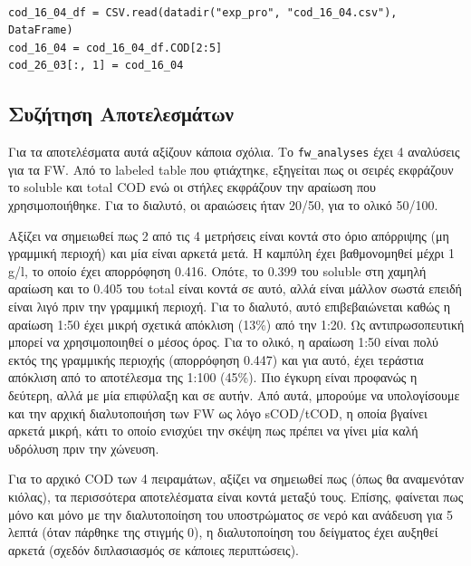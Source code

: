 \documentclass[11pt]{article}
\begin{document}
\begin{verbatim}

cod_16_04_df = CSV.read(datadir("exp_pro", "cod_16_04.csv"), DataFrame)
cod_16_04 = cod_16_04_df.COD[2:5]
cod_26_03[:, 1] = cod_16_04
\end{verbatim}

\subsection{Συζήτηση Αποτελεσμάτων}
\label{sec:org09090ba}
Για τα αποτελέσματα αυτά αξίζουν κάποια σχόλια. Το \texttt{fw\_analyses} έχει 4 αναλύσεις για τα FW. Από το labeled table που φτιάχτηκε, εξηγείται πως οι σειρές εκφράζουν το soluble και total COD ενώ οι στήλες εκφράζουν την αραίωση που χρησιμοποιήθηκε. Για το διαλυτό, οι αραιώσεις ήταν 20/50, για το ολικό 50/100.

Αξίζει να σημειωθεί πως 2 από τις 4 μετρήσεις είναι κοντά στο όριο απόρριψης (μη γραμμική περιοχή) και μία είναι αρκετά μετά. Η καμπύλη έχει βαθμονομηθεί μέχρι 1 g/l, το οποίο έχει απορρόφηση 0.416. Οπότε, το 0.399 του soluble στη χαμηλή αραίωση και το 0.405 του total είναι κοντά σε αυτό, αλλά είναι μάλλον σωστά επειδή είναι λιγό πριν την γραμμική περιοχή. Για το διαλυτό, αυτό επιβεβαιώνεται καθώς η αραίωση 1:50 έχει μικρή σχετικά απόκλιση (13\%) από την 1:20. Ως αντιπρωσοπευτική μπορεί να χρησιμοποιηθεί ο μέσος όρος. Για το ολικό, η αραίωση 1:50 είναι πολύ εκτός της γραμμικής περιοχής (απορρόφηση 0.447) και για αυτό, έχει τεράστια απόκλιση από το αποτέλεσμα της 1:100 (45\%). Πιο έγκυρη είναι προφανώς η δεύτερη, αλλά με μία επιφύλαξη και σε αυτήν. Από αυτά, μπορούμε να υπολογίσουμε και την αρχική διαλυτοποιήση των FW ως λόγο sCOD/tCOD, η οποία βγαίνει αρκετά μικρή, κάτι το οποίο ενισχύει την σκέψη πως πρέπει να γίνει μία καλή υδρόλυση πριν την χώνευση.

Για το αρχικό COD των 4 πειραμάτων, αξίζει να σημειωθεί πως (όπως θα αναμενόταν κιόλας), τα περισσότερα αποτελέσματα είναι κοντά μεταξύ τους. Επίσης, φαίνεται πως μόνο και μόνο με την διαλυτοποίηση του υποστρώματος σε νερό και ανάδευση για 5 λεπτά (όταν πάρθηκε της στιγμής 0), η διαλυτοποίηση του δείγματος έχει αυξηθεί αρκετά (σχεδόν διπλασιασμός σε κάποιες περιπτώσεις).
\end{document}
